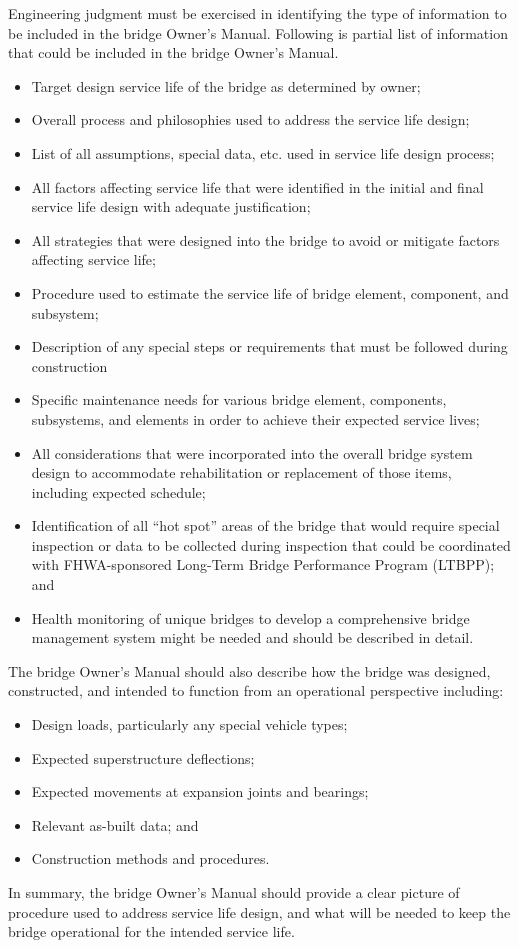 Engineering judgment must be exercised in identifying the type of information to be included in the bridge
Owner's Manual. Following is partial list of information that could be included in the bridge Owner's Manual.

\begin{itemize}
  \item Target design service life of the bridge as determined by owner;
  \item Overall process and philosophies used to address the service life design;
  \item List of all assumptions, special data, etc. used in service life design process;
  \item All factors affecting service life that were identified in the initial and final service life design with adequate
  justification;
  \item All strategies that were designed into the bridge to avoid or mitigate factors affecting service life;
  \item Procedure used to estimate the service life of bridge element, component, and subsystem;
  \item Description of any special steps or requirements that must be followed during construction
  \item Specific maintenance needs for various bridge element, components, subsystems, and elements in order to
  achieve their expected service lives;
  \item All considerations that were incorporated into the overall bridge system design to accommodate
  rehabilitation or replacement of those items, including expected schedule;
  \item Identification of all “hot spot” areas of the bridge that would require special inspection or data to be collected
  during inspection that could be coordinated with FHWA-sponsored Long-Term Bridge Performance Program
  (LTBPP); and
  \item Health monitoring of unique bridges to develop a comprehensive bridge management system might be
  needed and should be described in detail.
\end{itemize}

The bridge Owner's Manual should also describe how the bridge was designed, constructed, and intended to
function from an operational perspective including:

\begin{itemize}
  \item Design loads, particularly any special vehicle types;
  \item Expected superstructure deflections;
  \item Expected movements at expansion joints and bearings;
  \item Relevant as-built data; and
  \item Construction methods and procedures.
\end{itemize}

In summary, the bridge Owner's Manual should provide a clear picture of procedure used to address service life design, and what will be needed to keep the bridge operational for the intended service life.